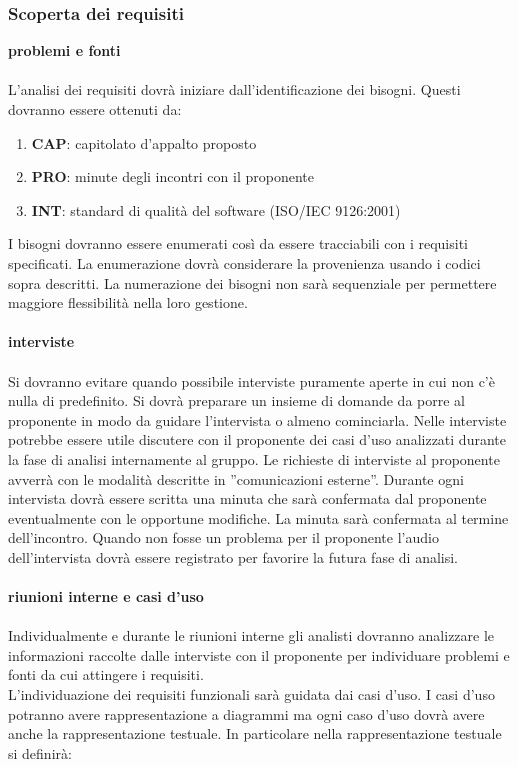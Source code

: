 {{		\subsubsection{Scoperta dei requisiti}{
			\textbf{problemi e fonti}\\\\
			L’analisi dei requisiti dovrà iniziare dall’identificazione dei bisogni. Questi dovranno essere ottenuti da:
			\begin{enumerate}
				\item \textbf{CAP}: capitolato d'appalto proposto
				\item \textbf{PRO}: minute degli incontri con il proponente
				\item \textbf{INT}: standard di qualità del software (ISO/IEC 9126:2001)
			\end{enumerate}
			I bisogni dovranno essere enumerati così da essere tracciabili con i requisiti specificati.
			La enumerazione dovrà considerare la provenienza usando i codici sopra descritti. La numerazione dei bisogni non sarà sequenziale per permettere maggiore flessibilità nella loro gestione.\\\\
			\textbf{interviste}\\\\
			Si dovranno evitare quando possibile interviste puramente aperte in cui non c’è nulla di predefinito. Si dovrà preparare un insieme di domande da porre al proponente in modo da guidare l’intervista o almeno cominciarla. Nelle interviste potrebbe essere utile discutere
			con il proponente dei casi d’uso analizzati durante la fase di analisi internamente al gruppo.
			Le richieste di interviste al proponente avverrà con le modalità descritte in ”comunicazioni esterne”. Durante ogni intervista dovrà essere scritta una minuta che sarà confermata dal proponente eventualmente con le opportune modifiche. La minuta sarà confermata al termine dell’incontro. Quando non fosse un problema per il proponente l’audio dell’intervista dovrà essere registrato per favorire la futura fase di analisi.\\\\
			\textbf{riunioni interne e casi d'uso}\\\\
			Individualmente e durante le riunioni interne gli analisti dovranno analizzare le informazioni raccolte dalle interviste con il proponente per individuare problemi e fonti da cui attingere i requisiti.\\
			L’individuazione dei requisiti funzionali sarà guidata dai casi d’uso. I casi d’uso potranno avere rappresentazione a diagrammi ma ogni caso d’uso dovrà avere anche la rappresentazione testuale. In particolare nella rappresentazione testuale si definirà:
}}}
